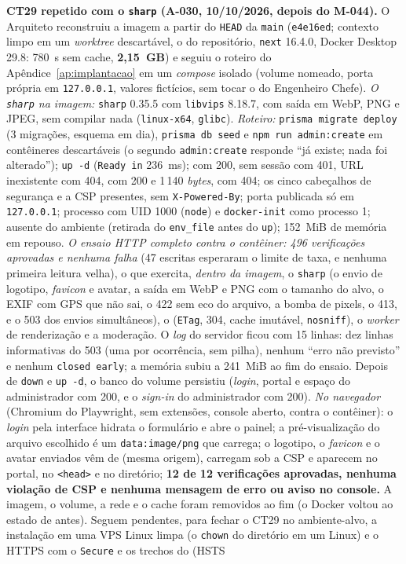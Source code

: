\textbf{CT29 repetido com o \texttt{sharp} (A-030, 10/10/2026, depois do M-044).} O Arquiteto reconstruiu a imagem a partir do \texttt{HEAD} da \texttt{main} (\texttt{e4e16ed}; contexto limpo em um \emph{worktree} descartável, o  do repositório, \texttt{next} 16.4.0, Docker Desktop 29.8: 780~s sem cache, \textbf{2,15~GB}) e seguiu o roteiro do Apêndice~\ref{ap:implantacao} em um \emph{compose} isolado (volume nomeado, porta própria em \texttt{127.0.0.1}, valores fictícios, sem tocar o  do Engenheiro Chefe). \emph{O \texttt{sharp} na imagem:} \texttt{sharp} 0.35.5 com \texttt{libvips} 8.18.7, com saída em WebP, PNG e JPEG, sem compilar nada (\texttt{linux-x64}, \texttt{glibc}). \emph{Roteiro:} \texttt{prisma migrate deploy} (3 migrações, esquema em dia), \texttt{prisma db seed} e \texttt{npm run admin:create} em contêineres descartáveis (o segundo \texttt{admin:create} responde ``já existe; nada foi alterado''); \texttt{up -d} (\texttt{Ready in} 236~ms);  com 200,  sem sessão com 401, URL inexistente com 404,  com 200 e 1\,140 \emph{bytes},  com 404; os cinco cabeçalhos de segurança e a CSP presentes, sem \texttt{X-Powered-By}; porta publicada só em \texttt{127.0.0.1}; processo com UID 1000 (\texttt{node}) e \texttt{docker-init} como processo 1;  ausente do ambiente (retirada do \texttt{env\_file} antes do \texttt{up}); 152~MiB de memória em repouso. \emph{O ensaio HTTP completo contra o contêiner: 496 verificações aprovadas e nenhuma falha} (47 escritas esperaram o limite de taxa, e nenhuma primeira leitura velha), o que exercita, \emph{dentro da imagem}, o \texttt{sharp} (o envio de logotipo, \emph{favicon} e avatar, a saída em WebP e PNG com o tamanho do alvo, o EXIF com GPS que não sai, o 422  sem eco do arquivo, a bomba de pixels, o 413, e o 503  dos envios simultâneos), o  (\texttt{ETag}, 304, cache imutável, \texttt{nosniff}), o \emph{worker} de renderização e a moderação. O \emph{log} do servidor ficou com 15 linhas: dez linhas informativas do 503  (uma por ocorrência, sem pilha), nenhum ``erro não previsto'' e nenhum \texttt{closed early}; a memória subiu a 241~MiB ao fim do ensaio. Depois de \texttt{down} e \texttt{up -d}, o banco do volume persistiu (\emph{login}, portal e espaço do administrador com 200, e o \emph{sign-in} do administrador com 200). \emph{No navegador} (Chromium do Playwright, sem extensões, console aberto, contra o contêiner): o \emph{login} pela interface hidrata o formulário e abre o painel; a pré-visualização do arquivo escolhido é um \texttt{data:image/png} que carrega; o logotipo, o \emph{favicon} e o avatar enviados vêm de  (mesma origem), carregam sob a CSP e aparecem no portal, no \texttt{<head>} e no diretório; \textbf{12 de 12 verificações aprovadas, nenhuma violação de CSP e nenhuma mensagem de erro ou aviso no console.} A imagem, o volume, a rede e o cache foram removidos ao fim (o Docker voltou ao estado de antes). Seguem pendentes, para fechar o CT29 no ambiente-alvo, a instalação em uma VPS Linux limpa (o \texttt{chown} do diretório  em um  Linux) e o HTTPS com o  \texttt{Secure} e os trechos do  (HSTS 